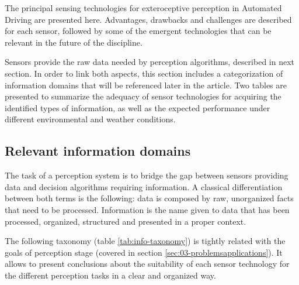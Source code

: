 
The principal sensing technologies for exteroceptive perception in Automated 
Driving are presented here. Advantages, drawbacks and 
challenges are described for each sensor, followed by some of the emergent 
technologies that can be relevant in the future of the discipline.

Sensors provide the raw data needed by perception algorithms, described in
next section. In order to link both aspects, this section includes a
categorization of information domains that will be referenced later in the
article.
Two tables are presented to summarize the adequacy of sensor technologies for 
acquiring the identified types of information, as well as the expected
performance under different environmental and weather conditions.

\subsection{Relevant information domains}

The task of a perception system is to bridge the gap between sensors providing 
data and decision algorithms requiring information.
A classical differentiation between both terms is the following: data is 
composed by raw, unorganized facts that need to be processed. 
Information is the name given to data that has been processed, organized, 
structured and presented in a proper context.

The following taxonomy (table \ref{tab:info-taxonomy}) is tightly related with the goals of perception stage
(covered in section \ref{sec:03-problemsapplications}). It allows to
present conclusions about the suitability of each sensor technology for
the different perception tasks in a clear and organized way.


